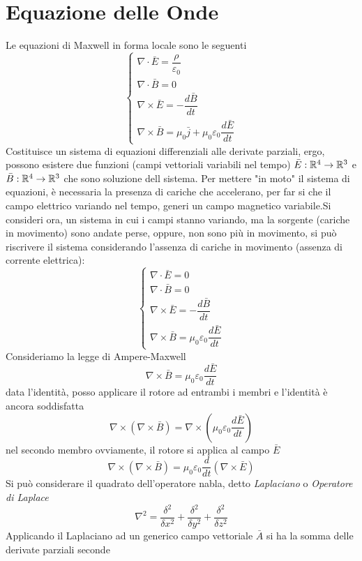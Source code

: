 \documentclass[10pt, letterpaper]{report}
\begin{document}
\section{Equazione delle Onde}
Le equazioni di Maxwell in forma locale sono le seguenti 
$$\begin{cases}
    \nabla \cdot \bar E = \dfrac{\rho}{\varepsilon_0}\\ 
    \nabla \cdot \bar B = 0\\ 
    \nabla \times \bar E = -\dfrac{d\bar B }{dt}\\ 
    \nabla \times \bar B = \mu_0\bar j +\mu_0 \varepsilon_0 \dfrac{d\bar E}{dt}
\end{cases} $$
Costituisce un sistema di equazioni differenziali alle derivate parziali, ergo, possono esistere due funzioni (campi vettoriali variabili nel tempo) $\bar E : {\mathbb R}^4\rightarrow {\mathbb R}^3$ e $\bar B : {\mathbb R}^4\rightarrow {\mathbb R}^3$ che sono soluzione dell sistema. Per mettere "in moto" il sistema di equazioni, è necessaria la presenza di cariche che accelerano, per far si che il campo elettrico variando nel tempo, generi un campo magnetico variabile.\acc Si consideri ora, un sistema in cui i campi stanno variando, ma la sorgente (cariche in movimento) sono andate perse, oppure, non sono più in movimento, si può riscrivere il sistema considerando l'assenza di cariche in movimento (assenza di corrente elettrica):
$$\begin{cases}
    \nabla \cdot \bar E = 0\\ 
    \nabla \cdot \bar B = 0\\ 
    \nabla \times \bar E = -\dfrac{d\bar B }{dt}\\ 
    \nabla \times \bar B = \mu_0 \varepsilon_0 \dfrac{d\bar E}{dt}
\end{cases} $$
Consideriamo la legge di Ampere-Maxwell
$$ \nabla \times \bar B = \mu_0 \varepsilon_0 \dfrac{d\bar E}{dt}$$
data l'identità, posso applicare il rotore ad entrambi i membri e l'identità è ancora soddisfatta 
$$\nabla \times(\nabla \times \bar B )= \nabla \times (\mu_0 \varepsilon_0 \dfrac{d\bar E}{dt})$$
nel secondo membro ovviamente, il rotore si applica al campo $\bar E$
$$\nabla \times(\nabla \times \bar B )= \mu_0 \varepsilon_0 \dfrac{d}{dt}(\nabla \times \bar E)$$
 Si può considerare il quadrato dell'operatore nabla, detto \textit{Laplaciano}  o \textit{Operatore di Laplace}
$$ \nabla^2=\frac{\delta^2}{\delta x^2}+\frac{\delta^2}{\delta y^2}+\frac{\delta^2}{\delta z^2}$$
Applicando il Laplaciano ad un generico campo vettoriale $\bar A$ si ha la somma delle derivate parziali seconde
\end{document}
